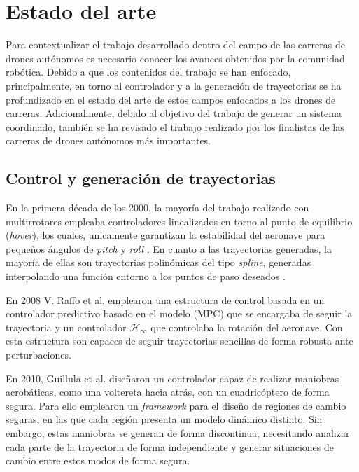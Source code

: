 \chapter{Estado del arte}

Para contextualizar el trabajo desarrollado dentro del campo de las carreras de drones autónomos es necesario conocer los avances obtenidos por la comunidad robótica. Debido a que los contenidos del trabajo se han enfocado, principalmente, en torno al controlador y a la generación de trayectorias se ha profundizado en el estado del arte de estos campos enfocados a los drones de carreras. Adicionalmente, debido al objetivo del trabajo de generar un sistema coordinado, también se ha revisado el trabajo realizado por los finalistas de las carreras de drones autónomos más importantes.

\section{Control y generación de trayectorias}

En la primera década de los 2000, la mayoría del trabajo realizado con multirrotores empleaba controladores linealizados en torno al punto de equilibrio (\textit{hover}), los cuales, unicamente garantizan la estabilidad del aeronave para pequeños ángulos de \textit{pitch} y \textit{roll} \cite{hoffmann2008quadrotor}. En cuanto a las trayectorias generadas, la mayoría de ellas son trayectorias polinómicas del tipo \textit{spline}, generadas interpolando una función entorno a los puntos de paso deseados \cite{vanek2005}\cite{barrientos2009}.

En 2008 V. Raffo et al. \cite{MPCRaffo2008} emplearon una estructura de control basada en un controlador predictivo basado en el modelo (MPC) que se encargaba de seguir la trayectoria y un controlador $\mathcal{H}_\infty$ que controlaba la rotación del aeronave. Con esta estructura son capaces de seguir trayectorias sencillas de forma robusta ante perturbaciones.

En 2010, Guillula et al. \cite{gillula2010design} diseñaron un controlador capaz de realizar maniobras acrobáticas, como una voltereta hacia atrás, con un cuadricóptero de forma segura. Para ello emplearon un \textit{framework} para el diseño de regiones de cambio seguras, en las que cada región presenta un modelo dinámico distinto. Sin embargo, estas maniobras se generan de forma discontinua, necesitando analizar cada parte de la trayectoria de forma independiente y generar situaciones de cambio entre estos modos de forma segura. 


